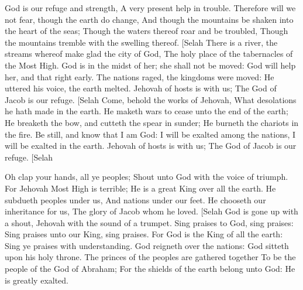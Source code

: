 God is our refuge and strength, A very present help in trouble.  Therefore will we not fear, though the earth do change, And though the mountains be shaken into the heart of the seas;  Though the waters thereof roar and be troubled, Though the mountains tremble with the swelling thereof. [Selah  There is a river, the streams whereof make glad the city of God, The holy place of the tabernacles of the Most High.  God is in the midst of her; she shall not be moved: God will help her, and that right early.  The nations raged, the kingdoms were moved: He uttered his voice, the earth melted.  Jehovah of hosts is with us; The God of Jacob is our refuge. [Selah  Come, behold the works of Jehovah, What desolations he hath made in the earth.  He maketh wars to cease unto the end of the earth; He breaketh the bow, and cutteth the spear in sunder; He burneth the chariots in the fire.  Be still, and know that I am God: I will be exalted among the nations, I will be exalted in the earth.  Jehovah of hosts is with us; The God of Jacob is our refuge. [Selah 

Oh clap your hands, all ye peoples; Shout unto God with the voice of triumph.  For Jehovah Most High is terrible; He is a great King over all the earth.  He subdueth peoples under us, And nations under our feet.  He chooseth our inheritance for us, The glory of Jacob whom he loved. [Selah  God is gone up with a shout, Jehovah with the sound of a trumpet.  Sing praises to God, sing praises: Sing praises unto our King, sing praises.  For God is the King of all the earth: Sing ye praises with understanding.  God reigneth over the nations: God sitteth upon his holy throne.  The princes of the peoples are gathered together To be the people of the God of Abraham; For the shields of the earth belong unto God: He is greatly exalted. 

